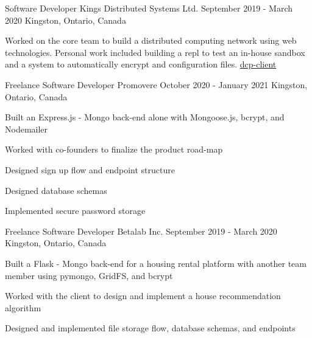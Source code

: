 

\begin{cventries}

  \cventry
    {Software Developer} %
    {Kings Distributed Systems Ltd.} %
    {September 2019 - March 2020} %
    {Kingston, Ontario, Canada} %
    {
      \begin{cvitems} %
        \item {Worked on the core team to build a distributed computing network using web technologies. Personal work included building a repl to test an in-house sandbox and a system to automatically encrypt and configuration files. \href{https://www.npmjs.com/package/dcp-client}{dcp-client}}
      \end{cvitems}
    }

  \cventry
    {Freelance Software Developer} %
    {Promovere} %
    {October 2020 - January 2021} %
    {Kingston, Ontario, Canada} %
    {
      \begin{cvitems} %
        \item {Built an Express.js - Mongo back-end alone with Mongoose.js, bcrypt, and Nodemailer}
        \item{Worked with co-founders to finalize the product road-map}
        \item{Designed sign up flow and endpoint structure}
        \item{Designed database schemas}
        \item{Implemented secure password storage}
      \end{cvitems}
    }

  \cventry
    {Freelance Software Developer} %
    {Betalab Inc.} %
    {September 2019 - March 2020} %
    {Kingston, Ontario, Canada} %
    {
      \begin{cvitems} %
        \item {Built a Flask - Mongo back-end for a housing rental platform with another team member using pymongo, GridFS, and bcrypt}
        \item{Worked with the client to design and implement a house recommendation algorithm}
        \item{Designed and implemented file storage flow, database schemas, and endpoints}
      \end{cvitems}
    }


\end{cventries}
